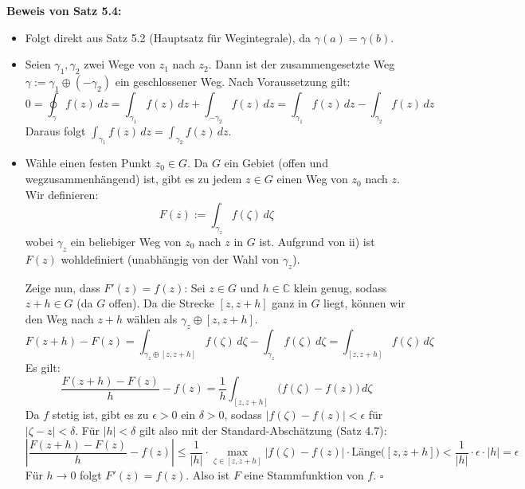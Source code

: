 \vspace{1em}
\noindent\textbf{Beweis von Satz 5.4:}
\begin{itemize}
    \item[\textbf{i) $\implies$ iii):}] Folgt direkt aus Satz 5.2 (Hauptsatz für Wegintegrale), da $\gamma(a) = \gamma(b)$.
    
    \item[\textbf{iii) $\implies$ ii):}] Seien $\gamma_1, \gamma_2$ zwei Wege von $z_1$ nach $z_2$. Dann ist der zusammengesetzte Weg $\gamma := \gamma_1 \oplus (-\gamma_2)$ ein geschlossener Weg. Nach Voraussetzung gilt:
    \[
    0 = \oint_{\gamma} f(z) \, dz = \int_{\gamma_1} f(z) \, dz + \int_{-\gamma_2} f(z) \, dz = \int_{\gamma_1} f(z) \, dz - \int_{\gamma_2} f(z) \, dz
    \]
    Daraus folgt $\int_{\gamma_1} f(z) \, dz = \int_{\gamma_2} f(z) \, dz$.

    \item[\textbf{ii) $\implies$ i):}] Wähle einen festen Punkt $z_0 \in G$. Da $G$ ein Gebiet (offen und wegzusammenhängend) ist, gibt es zu jedem $z \in G$ einen Weg von $z_0$ nach $z$. Wir definieren:
    \[
    F(z) := \int_{\gamma_z} f(\zeta) \, d\zeta
    \]
    wobei $\gamma_z$ ein beliebiger Weg von $z_0$ nach $z$ in $G$ ist. Aufgrund von ii) ist $F(z)$ wohldefiniert (unabhängig von der Wahl von $\gamma_z$).
    
    Zeige nun, dass $F'(z) = f(z)$: Sei $z \in G$ und $h \in \mathbb{C}$ klein genug, sodass $z+h \in G$ (da $G$ offen). Da die Strecke $[z, z+h]$ ganz in $G$ liegt, können wir den Weg nach $z+h$ wählen als $\gamma_z \oplus [z, z+h]$.
    \[
    F(z+h) - F(z) = \int_{\gamma_z \oplus [z, z+h]} f(\zeta) \, d\zeta - \int_{\gamma_z} f(\zeta) \, d\zeta = \int_{[z, z+h]} f(\zeta) \, d\zeta
    \]
    Es gilt:
    \[
    \frac{F(z+h) - F(z)}{h} - f(z) = \frac{1}{h} \int_{[z, z+h]} \big(f(\zeta) - f(z)\big) \, d\zeta
    \]
    Da $f$ stetig ist, gibt es zu $\epsilon > 0$ ein $\delta > 0$, sodass $|f(\zeta) - f(z)| < \epsilon$ für $|\zeta - z| < \delta$. Für $|h| < \delta$ gilt also mit der Standard-Abschätzung (Satz 4.7):
    \[
    \left|\frac{F(z+h) - F(z)}{h} - f(z)\right| \le \frac{1}{|h|} \cdot \max_{\zeta \in [z, z+h]} |f(\zeta) - f(z)| \cdot \text{Länge}\big([z, z+h]\big) < \frac{1}{|h|} \cdot \epsilon \cdot |h| = \epsilon
    \]
    Für $h \rightarrow 0$ folgt $F'(z) = f(z)$. Also ist $F$ eine Stammfunktion von $f$. \hfill $\square$
\end{itemize}
